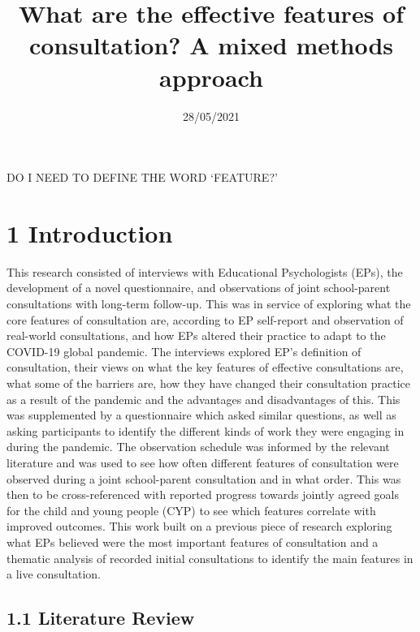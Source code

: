 \documentclass[
]{article}
\title{What are the effective features of consultation? A mixed methods
approach}
\author{}
\date{\vspace{-2.5em}28/05/2021}
\begin{document}
\maketitle

DO I NEED TO DEFINE THE WORD `FEATURE?'

\hypertarget{introduction}{%
\section{1 Introduction}\label{introduction}}

This research consisted of interviews with Educational Psychologists
(EPs), the development of a novel questionnaire, and observations of
joint school-parent consultations with long-term follow-up. This was in
service of exploring what the core features of consultation are,
according to EP self-report and observation of real-world consultations,
and how EPs altered their practice to adapt to the COVID-19 global
pandemic. The interviews explored EP's definition of consultation, their
views on what the key features of effective consultations are, what some
of the barriers are, how they have changed their consultation practice
as a result of the pandemic and the advantages and disadvantages of
this. This was supplemented by a questionnaire which asked similar
questions, as well as asking participants to identify the different
kinds of work they were engaging in during the pandemic. The observation
schedule was informed by the relevant literature and was used to see how
often different features of consultation were observed during a joint
school-parent consultation and in what order. This was then to be
cross-referenced with reported progress towards jointly agreed goals for
the child and young people (CYP) to see which features correlate with
improved outcomes. This work built on a previous piece of research
exploring what EPs believed were the most important features of
consultation and a thematic analysis of recorded initial consultations
to identify the main features in a live consultation.

\hypertarget{literature-review}{%
\subsection{1.1 Literature Review}\label{literature-review}}
\end{document}
